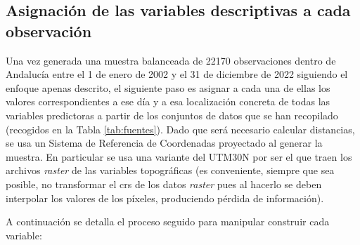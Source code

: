 \documentclass[12pt,a4paper,]{book}
\numberwithin{dummy}{section}
\theoremstyle{ocrenumbox}
\theoremstyle{blacknumex}
\theoremstyle{blacknumbox}
\theoremstyle{ocrenum}
\theoremstyle{ocrenum}
\begin{document}
\hypertarget{asignaciuxf3n-de-las-variables-descriptivas-a-cada-observaciuxf3n}{%
\subsection{Asignación de las variables descriptivas a cada
observación}\label{asignaciuxf3n-de-las-variables-descriptivas-a-cada-observaciuxf3n}}

Una vez generada una muestra balanceada de 22170 observaciones dentro de
Andalucía entre el 1 de enero de 2002 y el 31 de diciembre de 2022
siguiendo el enfoque apenas descrito, el siguiente paso es asignar a
cada una de ellas los valores correspondientes a ese día y a esa
localización concreta de todas las variables predictoras a partir de los
conjuntos de datos que se han recopilado (recogidos en la Tabla
\ref{tab:fuentes}). Dado que será necesario calcular distancias, se usa
un Sistema de Referencia de Coordenadas proyectado al generar la
muestra. En particular se usa una variante del UTM30N por ser el que
traen los archivos \emph{raster} de las variables topográficas (es
conveniente, siempre que sea posible, no transformar el crs de los datos
\emph{raster} pues al hacerlo se deben interpolar los valores de los
píxeles, produciendo pérdida de información).

A continuación se detalla el proceso seguido para manipular construir
cada variable:
\end{document}
